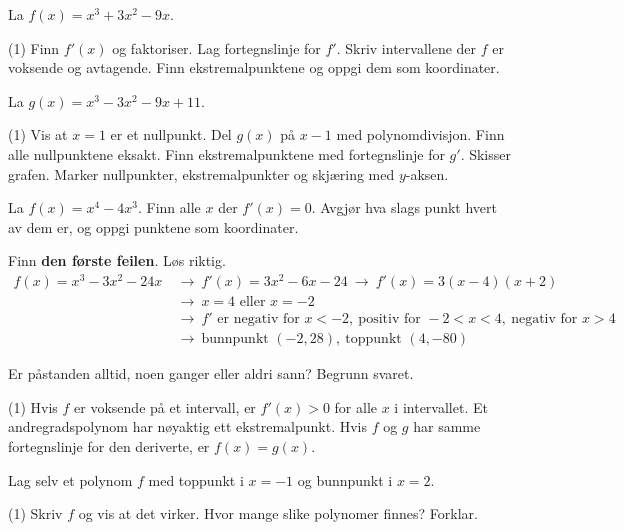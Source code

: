 
La $f(x) = x^3 + 3x^2 - 9x$.
\begin{tasks}(1)
  \task Finn $f'(x)$ og faktoriser. Lag fortegnslinje for $f'$.
  \task Skriv intervallene der $f$ er voksende og avtagende.
  \task Finn ekstremalpunktene og oppgi dem som koordinater.
\end{tasks}

La $g(x) = x^3 - 3x^2 - 9x + 11$.
\begin{tasks}(1)
  \task Vis at $x = 1$ er et nullpunkt. Del $g(x)$ på $x - 1$ med polynomdivisjon. Finn alle nullpunktene eksakt.
  \task Finn ekstremalpunktene med fortegnslinje for $g'$.
  \task Skisser grafen. Marker nullpunkter, ekstremalpunkter og skjæring med $y$-aksen.
\end{tasks}

La $f(x) = x^4 - 4x^3$. Finn alle $x$ der $f'(x) = 0$. Avgjør hva slags punkt hvert av dem er, og oppgi punktene som koordinater.

Finn \textbf{den første feilen}. Løs riktig.
\[ \begin{aligned}
f(x) = x^3 - 3x^2 - 24x \ &\longrightarrow\ f'(x) = 3x^2 - 6x - 24 \ \longrightarrow\ f'(x) = 3(x - 4)(x + 2)\\
&\longrightarrow\ x = 4 \text{ eller } x = -2\\
&\longrightarrow\ f' \text{ er negativ for } x < -2,\ \text{positiv for } -2 < x < 4,\ \text{negativ for } x > 4\\
&\longrightarrow\ \text{bunnpunkt } (-2, 28),\ \text{toppunkt } (4, -80)
\end{aligned} \]


Er påstanden alltid, noen ganger eller aldri sann? Begrunn svaret.
\begin{tasks}(1)
  \task Hvis $f$ er voksende på et intervall, er $f'(x) > 0$ for alle $x$ i intervallet.
  \task Et andregradspolynom har nøyaktig ett ekstremalpunkt.
  \task Hvis $f$ og $g$ har samme fortegnslinje for den deriverte, er $f(x) = g(x)$.
\end{tasks}

Lag selv et polynom $f$ med toppunkt i $x = -1$ og bunnpunkt i $x = 2$.
\begin{tasks}(1)
  \task Skriv $f$ og vis at det virker.
  \task Hvor mange slike polynomer finnes? Forklar.
\end{tasks}

